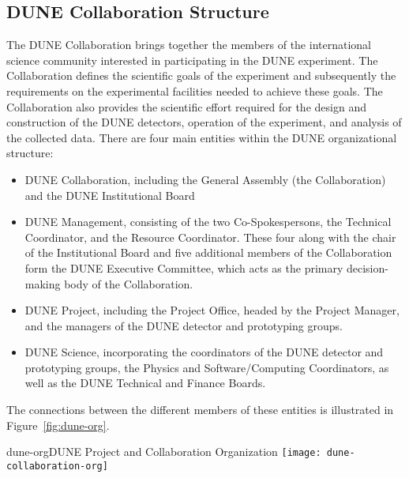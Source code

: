 \subsection{DUNE Collaboration Structure}

The DUNE Collaboration brings together the members of the international science community
interested in participating in the DUNE experiment.  The Collaboration defines the scientific goals of the experiment and subsequently the requirements on the experimental facilities needed to achieve these goals.  The Collaboration also provides the scientific effort required for the design and construction of the DUNE detectors, operation of the experiment, and analysis of the collected data. There are four main entities within the DUNE organizational structure:

\begin{itemize}
\item DUNE Collaboration, including the General Assembly (the Collaboration) and the DUNE Institutional Board 
\item DUNE Management, consisting of the two Co-Spokespersons, the Technical Coordinator, and the Resource Coordinator.  These four along with the chair of the Institutional Board and five additional members of the Collaboration form the DUNE Executive Committee, which acts as the primary decision-making body of the Collaboration.
\item DUNE Project, including the Project Office, headed by the Project Manager, and the managers of the DUNE detector and prototyping groups. 
\item DUNE Science, incorporating the coordinators of the DUNE detector and prototyping groups, the Physics and Software/Computing Coordinators, as well as the DUNE Technical and Finance Boards. 
\end{itemize}
The connections between the different members of these entities is illustrated in Figure~\ref{fig:dune-org}.

\begin{cdrfigure}{dune-org}{DUNE Project and Collaboration Organization}
  \texttt{[image: dune-collaboration-org]}
\end{cdrfigure}

